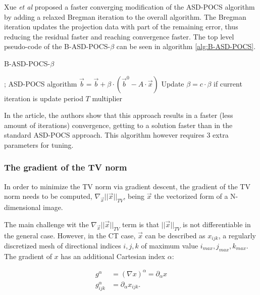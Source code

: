 Xue \textit{et al}\cite{B_ASD_POCS_beta} proposed a faster converging modification of the ASD-POCS algorithm by adding a relaxed Bregman iteration to the overall algorithm. The Bregman iteration updates the projection data with part of the remaining error, thus reducing the residual faster and reaching convergence faster. The top level pseudo-code of the B-ASD-POCS-$\beta$  can be seen in algorithm \ref{alg:B-ASD-POCS}.
%

\begin{algorithm}

\caption{B-ASD-POCS-$\beta$
\label{alg:B-ASD-POCS}}
\begin{algorithmic}[1]
;
\State ASD-POCS algorithm
\EndFor
\State $\vec{b}=\vec{b}+\beta\cdot(\vec{b}^0-A\cdot\vec{x})$
\State Update $\beta=c\cdot\beta$ if current iteration is update period $T$ multiplier 
\EndWhile

\end{algorithmic}
\end{algorithm}

In the article, the authors show that this approach results in a faster (less amount of iterations) convergence,  getting to a solution faster than in the standard ASD-POCS approach. This algorithm however requires 3 extra parameters for tuning. 


\FloatBarrier
\subsubsection{The gradient of the TV norm}

In order to minimize the TV norm via gradient descent, the gradient of the TV norm needs to be computed, $ \nabla_{\vec{x}} ||\vec x ||_{TV}$, being $\vec x$ the vectorized form of a N-dimensional image.

The main challenge wit the $ \nabla_{\vec{x}} ||\vec x ||_{TV}$ term is that $ ||\vec x ||_{TV}$ is not differentiable in the general case. However, in the CT case, $\vec{x}$ can be described as $x_{ijk}$, a regularly discretized mesh of directional indices $i,j,k$ of maximum value $i_{max},j_{max},k_{max}$. The gradient of $x$ has an additional Cartesian index $\alpha$:

\begin{align}
g^\alpha &=\left(\nabla x\right)^\alpha=\partial_\alpha x\\
g^\alpha_{ijk} & = \partial_\alpha x_{ijk}.
\end{align}

